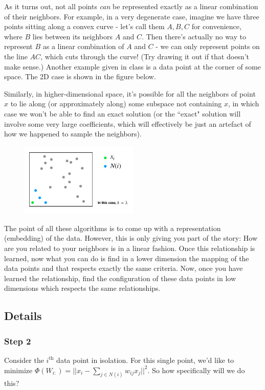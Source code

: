 As it turns out, not all points \textit{can} be represented exactly as a linear combination of their neighbors. For example, in a very degenerate case, imagine we have three points sitting along a convex curve - let's call them $A, B, C$ for convenience, where $B$ lies between its neighbors $A$ and $C$. Then there's actually no way to represent $B$ as a linear combination of $A$ and $C$ - we can only represent points on the line $AC$, which cuts through the curve! (Try drawing it out if that doesn't make sense.) Another example given in class is a data point at the corner of some space. The 2D case is shown in the figure below.

Similarly, in higher-dimensional space, it's possible for all the neighbors of point $x$ to lie along (or approximately along) some subspace not containing $x$, in which case we won't be able to find an exact solution (or the ``exact" solution will involve some very large coefficients, which will effectively be just an artefact of how we happened to sample the neighbors).

\begin{figure}[H]
\centering
\includegraphics[width=0.5\textwidth]{chapter_7/files/no_linear_comb_case.png}
\end{figure}

The point of all these algorithms is to come up with a representation (embedding) of the data. However, this is only giving you part of the story: How are you related to your neighbors is in a linear fashion. Once this relationship is learned, now what you can do is find in a lower dimension the mapping of the data points and that respects exactly the same criteria. Now, once you have learned the relationship, find the configuration of these data points in low dimensions which respects the same relationships.

\subsection*{Details}
\subsubsection*{Step 2}
Consider the $i^\text{th}$ data point in isolation. For this single point, we'd like to minimize $\Phi (W_{i:})=||x_i-\sum_{j\in N(i)} w_{ij} x_j||^2$. So how specifically will we do this?

